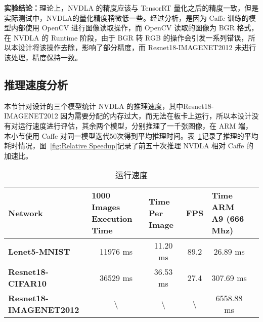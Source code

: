 \textbf{实验结论：}理论上，NVDLA 的精度应该与 TensorRT 量化之后的精度一致，但是实际测试中，NVDLA的量化精度稍微低一些。经过分析，是因为 Caffe 训练的模型内部使用 OpenCV 进行图像读取操作，而 OpenCV 读取的图像为 BGR 格式，在 NVDLA 的 Runtime 阶段，由于 BGR 转 RGB 的操作会引发一系列错误，所以本设计将该操作去除，影响了部分精度，而 Resnet18-IMAGENET2012 未进行该处理，精度保持一致。

\subsection{推理速度分析}

本节针对设计的三个模型统计 NVDLA 的推理速度，其中Resnet18-IMAGENET2012 因为需要分配的内存过大，而无法在板卡上运行，所以本设计没有对运行速度进行评估，其余两个模型，分别推理了一千张图像，在 ARM 端，本小节使用 Caffe 对同一模型迭代50次得到平均推理时间。表~\ref{tab:Execution Time}记录了推理的平均耗时情况，图~\ref{fig:Relative Speedup}记录了前五十次推理 NVDLA 相对 Caffe 的加速比。

\begin{table}[!htbp]
    \caption{运行速度}
    \label{tab:Execution Time}
    \centering
    \footnotesize%
    \setlength{\tabcolsep}{4pt}%
    \renewcommand{\arraystretch}{1.2}%
    \begin{tabular}{lccccc}
        \toprule
        \textbf{Network}               & \multicolumn{1}{l}{\textbf{1000 Images Execution Time}} & \multicolumn{1}{l}{\textbf{Time Per Image}} & \textbf{FPS}     & \multicolumn{1}{l}{\textbf{Time ARM A9 (666 Mhz)}} \\
        \midrule
        \textbf{Lenet5-MNIST}          & 11976 ms                                               & 11.20 ms                                   & 89.2             & 26.89 ms                                           \\
        \textbf{Resnet18-CIFAR10}      & 36529 ms                                               & 36.53 ms                                   & 27.4             & 307.69 ms                                          \\
        \textbf{Resnet18-IMAGENET2012} & \textbackslash{}                                       & \textbackslash{}                           & \textbackslash{} & 6558.88 ms                                         \\
        \bottomrule                   
    \end{tabular}
\end{table}

